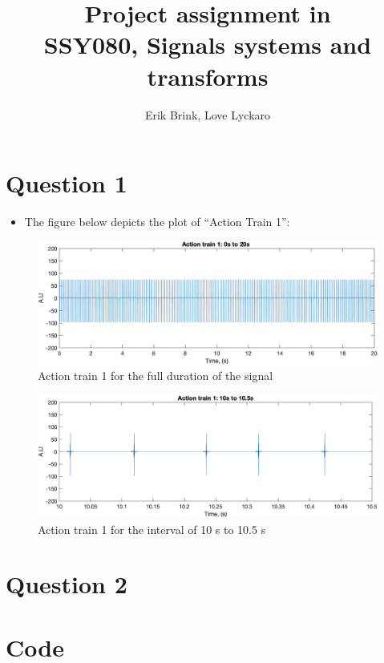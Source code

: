 \documentclass[a4paper, 12pt]{article}
\title{Project assignment in\\
       SSY080, Signals systems and transforms}
\author{Erik Brink, Love Lyckaro}
\begin{document}
\maketitle
{}
\newpage
{}

\section*{Question 1}
  \begin{itemize}
    \item The figure below depicts the plot of ``Action Train 1'':
  \end{itemize}
  \begin{figure}[H]
    \centering
    \includegraphics[width= \textwidth]{at1_0to20.png}
    \caption{Action train 1 for the full duration of the signal}
  \end{figure}
  \begin{figure}[H]
    \centering
    \includegraphics[width= \textwidth]{at1_10to105.png}
    \caption{Action train 1 for the interval of 10 s to 10.5 s}
  \end{figure}

\newpage
\section*{Question 2}

\newpage
{}
\section{Code}
    
\end{document}
